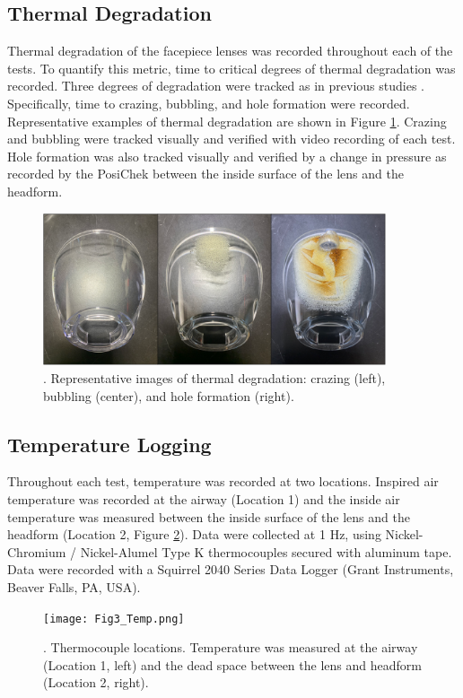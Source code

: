 \documentclass[sn-mathphys]{sn-jnl}%
\theoremstyle{thmstyleone}%
\theoremstyle{thmstyletwo}%
\theoremstyle{thmstylethree}%
\begin{document}
\subsection{Thermal Degradation}\label{subsec5}
Thermal degradation of the facepiece lenses was recorded throughout each of the tests. To quantify this metric, time to critical degrees of thermal degradation was recorded. Three degrees of degradation were tracked as in previous studies \cite{mensch_fire_2011}. Specifically, time to crazing, bubbling, and hole formation were recorded. Representative examples of thermal degradation are shown in Figure \ref{fig2}. Crazing and bubbling were tracked visually and verified with video recording of each test. Hole formation was also tracked visually and verified by a change in pressure as recorded by the PosiChek between the inside surface of the lens and the headform. 

\begin{figure}[h]%
\centering
\includegraphics[width=0.9\textwidth]{Fig2_ThermalDeg.png}
\caption{. Representative images of thermal degradation: crazing (left), bubbling (center), and hole formation (right).}\label{fig2}
\end{figure}

\subsection{Temperature Logging}\label{subsec6}
Throughout each test, temperature was recorded at two locations. Inspired air temperature was recorded at the airway (Location 1) and the inside air temperature was measured between the inside surface of the lens and the headform (Location 2, Figure \ref{fig3}). Data were collected at 1 Hz, using Nickel-Chromium / Nickel-Alumel Type K thermocouples secured with aluminum tape. Data were recorded with a Squirrel 2040 Series Data Logger (Grant Instruments, Beaver Falls, PA, USA).

\begin{figure}[h]%
\centering
\texttt{[image: Fig3\_Temp.png]}
\caption{. Thermocouple locations. Temperature was measured at the airway (Location 1, left) and the dead space between the lens and headform (Location 2, right).}\label{fig3}
\end{figure}
\end{document}
